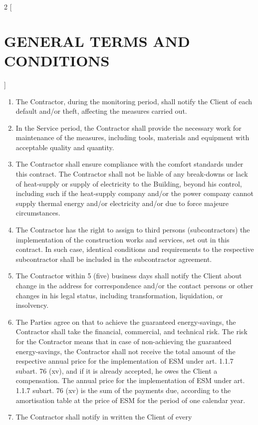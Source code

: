 \begin{multicols}{2} [\section{GENERAL TERMS AND CONDITIONS}]
\begin{enumerate}
    by the Client within 20 business days. The Contractor’s
    remuneration for cleaning of the common parts shall be paid
    independently and separately from the price under art. 30from the
    present general terms and conditions.
  \item The Contractor, during the monitoring period, shall notify the
    Client of each default and/or theft, affecting the measures
    carried out.
  \item In the Service period, the Contractor shall provide the
    necessary work for maintenance of the measures, including tools,
    materials and equipment with acceptable quality and quantity.
  \item The Contractor shall ensure compliance with the comfort
    standards under this contract. The Contractor shall not be liable
    of any break-downs or lack of heat-supply or supply of electricity
    to the Building, beyond his control, including such if the
    heat-supply company and/or the power company cannot supply thermal
    energy and/or electricity and/or due to force majeure
    circumstances.
  \item The Contractor has the right to assign to third persons
    (subcontractors) the implementation of the construction works and
    services, set out in this contract. In such case, identical
    conditions and requirements to the respective subcontractor shall
    be included in the subcontractor agreement.
  \item The Contractor within 5 (five) business days shall notify the
    Client about change in the address for correspondence and/or the
    contact persons or other changes in his legal status, including
    transformation, liquidation, or insolvency.
  \item The Parties agree on that to achieve the guaranteed
    energy-savings, the Contractor shall take the financial,
    commercial, and technical risk. The risk for the Contractor means
    that in case of non-achieving the guaranteed energy-savings, the
    Contractor shall not receive the total amount of the respective
    annual price for the implementation of ESM under art.  1.1.7
    subart. 76 (xv), and if it is already accepted, he owes the Client
    a compensation. The annual price for the implementation of ESM
    under art. 1.1.7 subart. 76 (xv) is the sum of the payments due,
    according to the amortisation table at the price of ESM for the
    period of one calendar year.
  \item The Contractor shall notify in written the Client of every

\end{enumerate}
\end{multicols}
